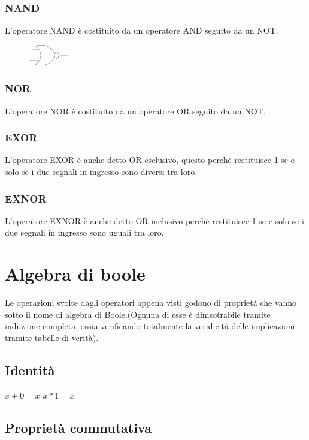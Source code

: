 \documentclass[a4paper]{book}
\begin{document}
\subsubsection*{NAND}

L'operatore NAND è costituito da un operatore AND seguito da un NOT.
\begin{figure}
\includegraphics{NorGate}
\end{figure}
\subsubsection*{NOR}

L'operatore NOR è costituito da un operatore OR seguito da un NOT.

\subsubsection*{EXOR}
L'operatore EXOR è anche detto OR esclusivo, questo perchè restituisce 1 se e solo se i due segnali in ingresso sono diversi tra loro.
\subsubsection*{EXNOR}
L'operatore EXNOR è anche detto OR inclusivo perchè restituisce 1 se e solo se i due segnali in ingresso sono uguali tra loro.

\newpage
\section{Algebra di boole}
Le operazioni svolte dagli operatori appena visti godono di proprietà che vanno sotto il nome di algebra di Boole.\newline (Ognuna di esse è dimsotrabile tramite induzione completa, ossia verificando totalmente la veridicità delle implicazioni tramite tabelle di verità).
\subsection*{Identità}

\(x+0=x \) \newline
\(x*1=x \)

\subsection*{Proprietà commutativa}
\end{document}
